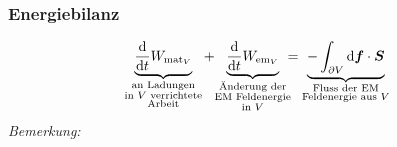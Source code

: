 \subsubsection{Energiebilanz}

\begin{equation*}
\ub{\prd{}{t} W_{\tx{mat} _V}}_{\mathclap{\substack{\tx{an Ladungen} \\ \tx{in } V \tx{ verrichtete} \\ \tx{Arbeit}}}} \ \ + \ \ \ub{\prd{}{t} W_{\tx{em}_V}}_{\mathclap{\substack{\tx{Änderung der} \\ \tx{EM Feldenergie} \\ \tx{in } V}}} \ = \ \ub{- \int_{\partial V} \dd \vec{f} \cdot \vec{S}}_{\mathclap{\substack{\tx{Fluss der EM} \\ \tx{Feldenergie aus } V}}}
\end{equation*}
\emph{Bemerkung:}
